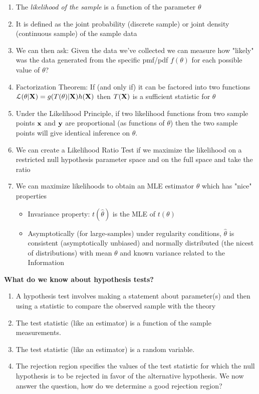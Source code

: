 \documentclass[11pt,]{article}
\def\bx{{\bf x}}
\def\by{{\bf y}}
\def\bX{{\bf X}}
\def\thetahat{{\widehat\theta}}
\def\Lsc{{\cal L}}
\begin{document}
\begin{enumerate}
\item The {\em likelihood of the sample} is a function of the parameter $\theta$
\item It is defined as the joint probability (discrete sample) or joint density (continuous sample) of the sample data
\item We can then ask: Given the data we've collected we can measure how "likely" was the data generated from the specific pmf/pdf $f(\theta)$ for each possible value of $\theta$?
\item Factorization Theorem: If (and only if) it can be factored into two functions $\Lsc(\theta |\bX) = g(T(\theta) | \bX)h(\bX)$ then $T(\bX)$ is a sufficient statistic for $\theta$
\item Under the Likelihood Principle, if two likelihood functions from two sample points $\bx$ and $\by$ are proportional (as functions of $\theta$) then the two sample points will give identical inference on  $\theta$.
\item We can create a Likelihood Ratio Test if we maximize the likelihood on a restricted null hypothesis parameter space and on the full space and take the ratio
\item We can maximize likelihoods to obtain an MLE estimator $\thetahat$ which has "nice" properties
\begin{itemize}
\item Invariance property: $t(\thetahat)$ is the MLE of $t(\theta)$
\item Asymptotically (for large-samples) under regularity conditions, $\thetahat$ is consistent (asymptotically unbiased) and normally distributed (the nicest of distributions) with mean $\theta$ and known variance related to the Information
\end{itemize}

\end{enumerate}

\noindent\textbf{What do we know about hypothesis tests?}

\begin{enumerate}
\item A hypothesis test involves making a statement about parameter(s) and then using a statistic to compare the observed sample with the theory
\item The test statistic (like an estimator) is a function of the sample measurements.
\item The test statistic (like an estimator) is a random variable.
\item The rejection region specifies the values of the test statistic for which the null hypothesis is to be rejected in favor of the alternative hypothesis. We now answer the question, how do we determine a good rejection region?

\end{enumerate}
\end{document}
